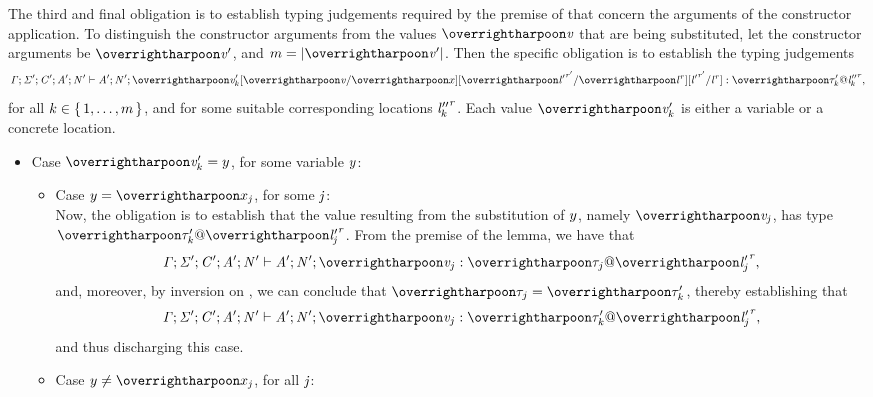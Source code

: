 \begin{nproof}
\begin{bcase}
    The third and final obligation is to establish typing judgements required by the premise of \tdatacon{}
    that concern the arguments of the constructor application.
    To distinguish the constructor arguments from the values $\overharpoon{\VAL}$ that are being substituted,
    let the constructor arguments be $\overharpoon{\VAL'}$, and $m = |\overharpoon{\VAL'}|$.
    Then the specific obligation is to establish the typing judgements
    \begin{displaymath}
       \TENV;\SENV';\CENV';\AENV';\NENV' \vdash \AENV';\NENV';\substlemmasubsts{\overharpoon{\VAL'_{k}}} : \overharpoon{\tyatlocreg{\TYP_{k}'}{\loc''_{k}}{\reg}},
     \end{displaymath}
     for all $k \in \{ \, 1, \ldots, m \,\}$, and for some suitable corresponding locations
     ${\mathit{l}''_{k}}^{\mathit{r}}$.
     Each value $\overharpoon{\VAL'_k}$ is either a variable or a concrete location.
    \begin{itemize}
    \item Case $\overharpoon{\VAL'_k} = \yvar$, for some variable $y$:\\
      \begin{itemize}
      \item Case $\yvar = \overharpoon{\var_{\indj}}$, for some $\mathit{j}$:\\
        Now, the obligation is to establish that the value resulting from the substitution of $y$, namely
        $\overharpoon{\VAL_{\indj}}$, has type $\overharpoon{\TYP'_{k}} \ensuremath{@} \overharpoon{\locreg{\loc'_{\indj}}{\reg}}$.
        From the premise of the lemma, we have that
        \begin{displaymath}
        \TENV; \SENV'; \CENV'; \AENV'; \NENV' \vdash \AENV'; \NENV'; \overharpoon{\VAL_j} : \overharpoon{\TYP_j} \ensuremath{@} \overharpoon{\locreg{\loc'_j}{\reg}},
        \end{displaymath}
        and, moreover, by inversion on \tdatacon{}, we can conclude that $\overharpoon{\TYP_j} = \overharpoon{\TYP'_k}$,
        thereby establishing that
       \begin{displaymath}
        \TENV; \SENV'; \CENV'; \AENV'; \NENV' \vdash \AENV'; \NENV'; \overharpoon{\VAL_j} : \overharpoon{\TYP'_k} \ensuremath{@} \overharpoon{\locreg{\loc'_j}{\reg}},
        \end{displaymath}
        and thus discharging this case.
      \item Case $\yvar \neq \overharpoon{\var_{\indj}}$, for all $\mathit{j}$:\\

\end{itemize}
\end{itemize}
\end{bcase}
\end{nproof}
